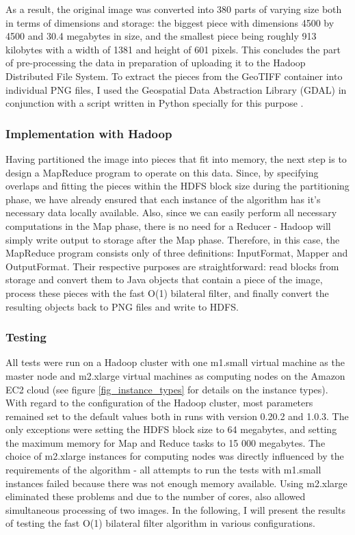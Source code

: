 \documentclass [12pt,a4paper]{report}
\begin{document}
As a result, the original image was converted into 380 parts of varying size both in terms of dimensions and storage: the biggest piece with dimensions 4500 by 4500 and 30.4 megabytes in size, and the smallest piece being roughly 913 kilobytes with a width of 1381 and height of 601 pixels. This concludes the part of pre-processing the data in preparation of uploading it to the Hadoop Distributed File System.
To extract the pieces from the GeoTIFF container into individual PNG files, I used the Geospatial Data Abstraction Library (GDAL) in conjunction with a script written in Python specially for this purpose \cite{gdal}.

\subsubsection{Implementation with Hadoop}

Having partitioned the image into pieces that fit into memory, the next step is to design a MapReduce program to operate on this data. Since, by specifying overlaps and fitting the pieces within the HDFS block size during the partitioning phase, we have already ensured that each instance of the algorithm has it's necessary data locally available. Also, since we can easily perform all necessary computations in the Map phase, there is no need for a Reducer - Hadoop will simply write output to storage after the Map phase. Therefore, in this case, the MapReduce program consists only of three definitions: InputFormat, Mapper and OutputFormat. Their respective purposes are straightforward: read blocks from storage and convert them to Java objects that contain a piece of the image, process these pieces with the fast O(1) bilateral filter, and finally convert the resulting objects back to PNG files and write to HDFS. 

\subsubsection{Testing}

All tests were run on a Hadoop cluster with one m1.small virtual machine as the master node and m2.xlarge virtual machines as computing nodes on the Amazon EC2 cloud (see figure \ref{fig_instance_types} for details on the instance types). With regard to the configuration of the Hadoop cluster, most parameters remained set to the default values both in runs with version 0.20.2 and 1.0.3. The only exceptions were setting the HDFS block size to 64 megabytes, and setting the maximum memory for Map and Reduce tasks to 15 000 megabytes. The choice of m2.xlarge instances for computing nodes was directly influenced by the requirements of the algorithm - all attempts to run the tests with m1.small instances failed because there was not enough memory available. Using m2.xlarge eliminated these problems and due to the number of cores, also allowed simultaneous processing of two images. In the following, I will present the results of testing the fast O(1) bilateral filter algorithm in various configurations.
\end{document}
